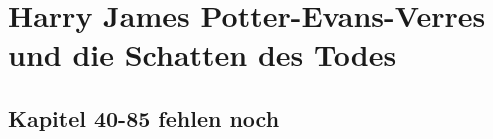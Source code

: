 \part{Harry James Potter-Evans-Verres und die Schatten des Todes}










% 
% 
% 
% 
% 
% 
% 
% 
% 
% 
% 
% 
% 
% 
% 
% 
% 
% 
% 
% 
% 
% 
% 
% 
% 
% 
% 
% 
% 
% 
% 
% 
% 
% 
% 
% 
% 
% 
\chapter*{Kapitel 40-85 fehlen noch}
